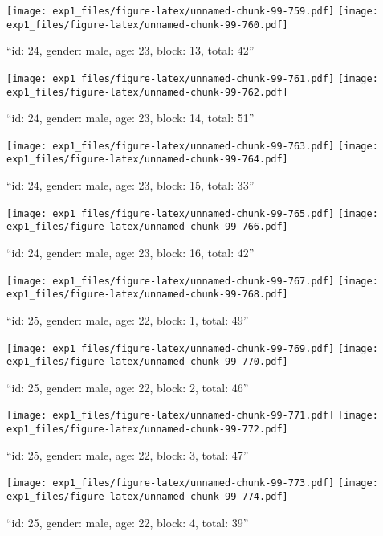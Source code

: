 \documentclass[,]{article}
\begin{document}
\texttt{[image: exp1\_files/figure-latex/unnamed-chunk-99-759.pdf]}
\texttt{[image: exp1\_files/figure-latex/unnamed-chunk-99-760.pdf]}

\newpage
[1] 

``id: 24, gender: male, age: 23, block: 13, total: 42''

\texttt{[image: exp1\_files/figure-latex/unnamed-chunk-99-761.pdf]}
\texttt{[image: exp1\_files/figure-latex/unnamed-chunk-99-762.pdf]}

\newpage
[1] 

``id: 24, gender: male, age: 23, block: 14, total: 51''

\texttt{[image: exp1\_files/figure-latex/unnamed-chunk-99-763.pdf]}
\texttt{[image: exp1\_files/figure-latex/unnamed-chunk-99-764.pdf]}

\newpage
[1] 

``id: 24, gender: male, age: 23, block: 15, total: 33''

\texttt{[image: exp1\_files/figure-latex/unnamed-chunk-99-765.pdf]}
\texttt{[image: exp1\_files/figure-latex/unnamed-chunk-99-766.pdf]}

\newpage
[1] 

``id: 24, gender: male, age: 23, block: 16, total: 42''

\texttt{[image: exp1\_files/figure-latex/unnamed-chunk-99-767.pdf]}
\texttt{[image: exp1\_files/figure-latex/unnamed-chunk-99-768.pdf]}

\newpage
[1] 

``id: 25, gender: male, age: 22, block: 1, total: 49''

\texttt{[image: exp1\_files/figure-latex/unnamed-chunk-99-769.pdf]}
\texttt{[image: exp1\_files/figure-latex/unnamed-chunk-99-770.pdf]}

\newpage
[1] 

``id: 25, gender: male, age: 22, block: 2, total: 46''

\texttt{[image: exp1\_files/figure-latex/unnamed-chunk-99-771.pdf]}
\texttt{[image: exp1\_files/figure-latex/unnamed-chunk-99-772.pdf]}

\newpage
[1] 

``id: 25, gender: male, age: 22, block: 3, total: 47''

\texttt{[image: exp1\_files/figure-latex/unnamed-chunk-99-773.pdf]}
\texttt{[image: exp1\_files/figure-latex/unnamed-chunk-99-774.pdf]}

\newpage
[1] 

``id: 25, gender: male, age: 22, block: 4, total: 39''
\end{document}
